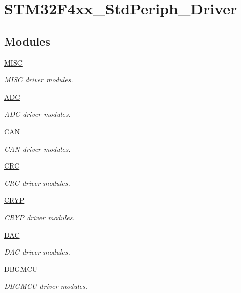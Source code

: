 \hypertarget{group___s_t_m32_f4xx___std_periph___driver}{\section{S\-T\-M32\-F4xx\-\_\-\-Std\-Periph\-\_\-\-Driver}
\label{group___s_t_m32_f4xx___std_periph___driver}
}
\subsection*{Modules}
\begin{DoxyCompactItemize}
\item 
\hyperlink{group___m_i_s_c}{M\-I\-S\-C}
\begin{DoxyCompactList}\small\item\em M\-I\-S\-C driver modules. \end{DoxyCompactList}\item 
\hyperlink{group___a_d_c}{A\-D\-C}
\begin{DoxyCompactList}\small\item\em A\-D\-C driver modules. \end{DoxyCompactList}\item 
\hyperlink{group___c_a_n}{C\-A\-N}
\begin{DoxyCompactList}\small\item\em C\-A\-N driver modules. \end{DoxyCompactList}\item 
\hyperlink{group___c_r_c}{C\-R\-C}
\begin{DoxyCompactList}\small\item\em C\-R\-C driver modules. \end{DoxyCompactList}\item 
\hyperlink{group___c_r_y_p}{C\-R\-Y\-P}
\begin{DoxyCompactList}\small\item\em C\-R\-Y\-P driver modules. \end{DoxyCompactList}\item 
\hyperlink{group___d_a_c}{D\-A\-C}
\begin{DoxyCompactList}\small\item\em D\-A\-C driver modules. \end{DoxyCompactList}\item 
\hyperlink{group___d_b_g_m_c_u}{D\-B\-G\-M\-C\-U}
\begin{DoxyCompactList}\small\item\em D\-B\-G\-M\-C\-U driver modules. \end{DoxyCompactList}\item 

\end{DoxyCompactItemize}
